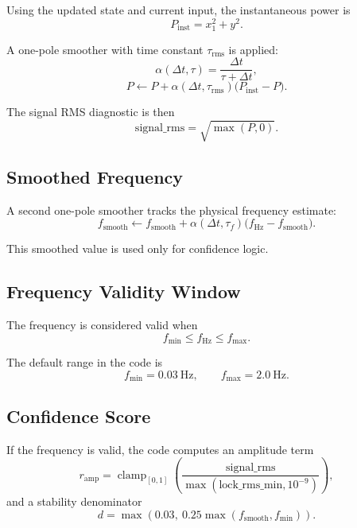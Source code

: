 \documentclass[conference]{IEEEtran}
\begin{document}
Using the updated state and current input, the instantaneous power is
\begin{equation}
  P_{\text{inst}} = x_1^2 + y^2.
\end{equation}

A one-pole smoother with time constant $\tau_{\text{rms}}$ is applied:
\begin{equation}
  \alpha(\Delta t,\tau) = \frac{\Delta t}{\tau+\Delta t},
\end{equation}
\begin{equation}
  P \leftarrow P + \alpha(\Delta t,\tau_{\text{rms}})
  \bigl(P_{\text{inst}} - P\bigr).
\end{equation}

The signal RMS diagnostic is then
\begin{equation}
  \text{signal\_rms} = \sqrt{\max(P,0)}.
\end{equation}

\subsection{Smoothed Frequency}

A second one-pole smoother tracks the physical frequency estimate:
\begin{equation}
  f_{\text{smooth}} \leftarrow f_{\text{smooth}}
  + \alpha(\Delta t,\tau_f)\bigl(f_{\text{Hz}} - f_{\text{smooth}}\bigr).
\end{equation}

This smoothed value is used only for confidence logic.

\subsection{Frequency Validity Window}

The frequency is considered valid when
\begin{equation}
  f_{\min} \le f_{\text{Hz}} \le f_{\max}.
\end{equation}

The default range in the code is
\begin{equation}
  f_{\min} = 0.03~\text{Hz}, \qquad
  f_{\max} = 2.0~\text{Hz}.
\end{equation}

\subsection{Confidence Score}

If the frequency is valid, the code computes an amplitude term
\begin{equation}
  r_{\text{amp}} =
  \operatorname{clamp}_{[0,1]}
  \left(
  \frac{\text{signal\_rms}}
       {\max(\text{lock\_rms\_min},10^{-9})}
  \right),
\end{equation}
and a stability denominator
\begin{equation}
  d = \max\!\left(0.03,\ 0.25\max(f_{\text{smooth}}, f_{\min})\right).
\end{equation}
\end{document}
